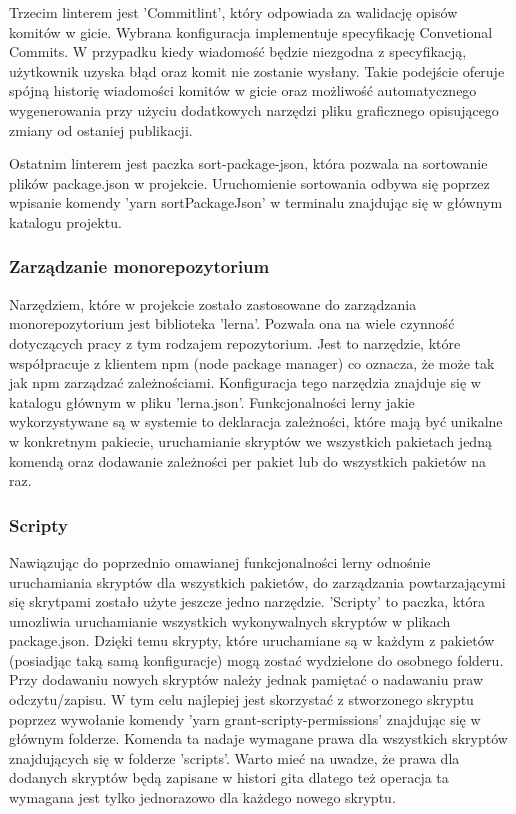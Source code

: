 Trzecim linterem jest 'Commitlint', który odpowiada za walidację opisów komitów w gicie. Wybrana konfiguracja implementuje specyfikację Convetional Commits. W przypadku kiedy wiadomość będzie niezgodna z specyfikacją, użytkownik uzyska błąd oraz komit nie zostanie wysłany. Takie podejście oferuje spójną historię wiadomości komitów w gicie oraz możliwość automatycznego wygenerowania przy użyciu dodatkowych narzędzi pliku graficznego opisującego zmiany od ostaniej publikacji.

Ostatnim linterem jest paczka sort-package-json, która pozwala na sortowanie plików package.json w projekcie. Uruchomienie sortowania odbywa się poprzez wpisanie komendy 'yarn sortPackageJson' w terminalu znajdując się w głównym katalogu projektu. 

\subsubsection{Zarządzanie monorepozytorium}
Narzędziem, które w projekcie zostało zastosowane do zarządzania monorepozytorium jest biblioteka 'lerna'. Pozwala ona na wiele czynność dotyczących pracy z tym rodzajem repozytorium. Jest to narzędzie, które współpracuje z klientem npm (node package manager) co oznacza, że może tak jak npm zarządzać zależnościami. Konfiguracja tego narzędzia znajduje się w katalogu głównym w pliku 'lerna.json'. Funkcjonalności lerny jakie wykorzystywane są w systemie to deklaracja zależności, które mają być unikalne w konkretnym pakiecie, uruchamianie skryptów we wszystkich pakietach jedną komendą oraz dodawanie zależności per pakiet lub do wszystkich pakietów na raz.

\subsubsection{Scripty}
Nawiązując do poprzednio omawianej funkcjonalności lerny odnośnie uruchamiania skryptów dla wszystkich pakietów, do zarządzania powtarzającymi się skrytpami zostało użyte jeszcze jedno narzędzie. 'Scripty' to paczka, która umozliwia uruchamianie wszystkich wykonywalnych skryptów w plikach package.json. Dzięki temu skrypty, które uruchamiane są w każdym z pakietów (posiadjąc taką samą konfiguracje) mogą zostać wydzielone do osobnego folderu. Przy dodawaniu nowych skryptów należy jednak pamiętać o nadawaniu praw odczytu/zapisu. W tym celu najlepiej jest skorzystać z stworzonego skryptu poprzez wywołanie komendy 'yarn grant-scripty-permissions' znajdując się w głównym folderze. Komenda ta nadaje wymagane prawa dla wszystkich skryptów znajdujących się w folderze 'scripts'. Warto mieć na uwadze, że prawa dla dodanych skryptów będą zapisane w histori gita dlatego też operacja ta wymagana jest tylko jednorazowo dla każdego nowego skryptu.

